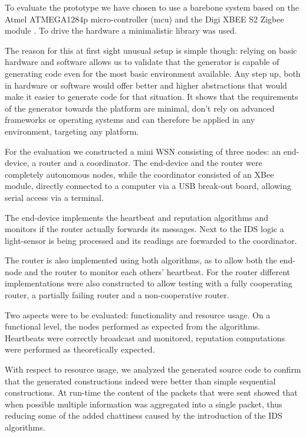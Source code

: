 \documentclass[conference]{IEEEtran}
\begin{document}
To evaluate the prototype we have chosen to use a barebone system based on the
Atmel ATMEGA1284p micro-controller (mcu) \cite{datasheet:atmega1284p} and the
Digi XBEE S2 Zigbee module \cite{datasheet:xbee}. To drive the hardware a
minimalistic library was used.

The reason for this at first sight unusual setup is simple though: relying on
basic hardware and software allows us to validate that the generator is capable
of generating code even for the most basic environment available. Any step up,
both in hardware or software would offer better and higher abstractions that
would make it easier to generate code for that situation. It shows that the
requirements of the generator towards the platform are minimal, don't rely on
advanced frameworks or operating systems and can therefore be applied in any
environment, targeting any platform.

For the evaluation we constructed a mini WSN consisting of three nodes: an
end-device, a router and a coordinator. The end-device and the router were
completely autonomous nodes, while the coordinator consisted of an XBee module,
directly connected to a computer via a USB break-out board, allowing serial
access via a terminal.

The end-device implements the heartbeat and reputation algorithms and monitors
if the router actually forwards its messages. Next to the IDS logic a
light-sensor is being processed and its readings are forwarded to the
coordinator.

The router is also implemented using both algorithms, as to allow both the
end-node and the router to monitor each others' heartbeat. For the router
different implementations were also constructed to allow testing with a fully
cooperating router, a partially failing router and a non-cooperative router.

Two aspects were to be evaluated: functionality and resource usage. On a
functional level, the nodes performed as expected from the algorithms.
Heartbeats were correctly broadcast and monitored, reputation computations were
performed as theoretically expected.

With respect to resource usage, we analyzed the generated source code to
confirm that the generated constructions indeed were better than simple
sequential constructions. At run-time the content of the packets that were sent
showed that when possible multiple information was aggregated into a single
packet, thus reducing some of the added chattiness caused by the introduction
of the IDS algorithms.
\end{document}
